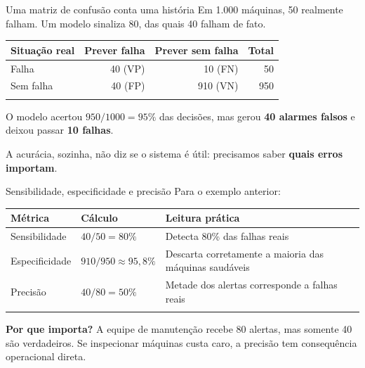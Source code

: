 \documentclass[
  10pt,
  ignorenonframetext,
  aspectratio=169,
  brazilian,
]{beamer}
\newcounter{none} %
\begin{document}
\begin{frame}{Uma matriz de confusão conta uma história}
\protect{}\label{uma-matriz-de-confusuxe3o-conta-uma-histuxf3ria}
Em 1.000 máquinas, 50 realmente falham. Um modelo sinaliza 80, das quais
40 falham de fato.

{\def\LTcaptype{none} %
\begin{longtable}[]{@{}lrrr@{}}
\toprule\noalign{}
Situação real & Prever falha & Prever sem falha & Total \\
\midrule\noalign{}
\endhead
Falha & 40 (VP) & 10 (FN) & 50 \\
Sem falha & 40 (FP) & 910 (VN) & 950 \\
\bottomrule\noalign{}
\end{longtable}
}

O modelo acertou \(950/1000=95\%\) das decisões, mas gerou \textbf{40
alarmes falsos} e deixou passar \textbf{10 falhas}.

A acurácia, sozinha, não diz se o sistema é útil: precisamos saber
\textbf{quais erros importam}.
\end{frame}

\begin{frame}{Sensibilidade, especificidade e precisão}
\protect{}\label{sensibilidade-especificidade-e-precisuxe3o}
Para o exemplo anterior:

{\def\LTcaptype{none} %
\begin{longtable}[]{@{}
  >{\raggedright\arraybackslash}p{}
  >{\raggedright\arraybackslash}p{}
  >{\raggedright\arraybackslash}p{}@{}}
\toprule\noalign{}
\begin{minipage}[b]{\linewidth}\raggedright
Métrica
\end{minipage} & \begin{minipage}[b]{\linewidth}\raggedright
Cálculo
\end{minipage} & \begin{minipage}[b]{\linewidth}\raggedright
Leitura prática
\end{minipage} \\
\midrule\noalign{}
\endhead
Sensibilidade & \(40/50=80\%\) & Detecta 80\% das falhas reais \\
Especificidade & \(910/950\approx95{,}8\%\) & Descarta corretamente a
maioria das máquinas saudáveis \\
Precisão & \(40/80=50\%\) & Metade dos alertas corresponde a falhas
reais \\
\bottomrule\noalign{}
\end{longtable}
}

\textbf{Por que importa?} A equipe de manutenção recebe 80 alertas, mas
somente 40 são verdadeiros. Se inspecionar máquinas custa caro, a
precisão tem consequência operacional direta.
\end{frame}
\end{document}

